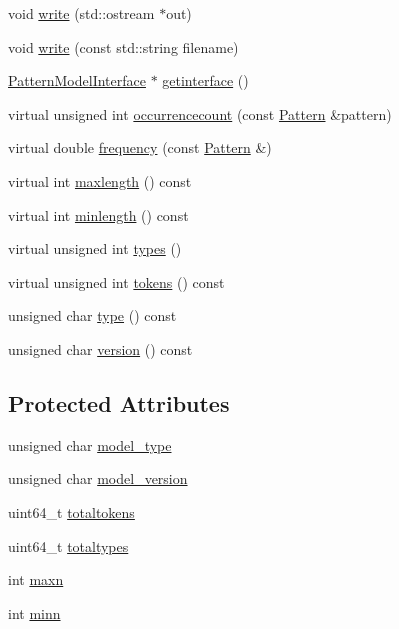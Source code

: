 \begin{DoxyCompactItemize}
void \hyperlink{classPatternSetModel_a8b5731f823fd868cfc6b219e01b13343}{write} (std\+::ostream $\ast$out)
\item 
void \hyperlink{classPatternSetModel_ac1fe33cf4ea003f37779fd39319d06fa}{write} (const std\+::string filename)
\item 
\hyperlink{classPatternModelInterface}{Pattern\+Model\+Interface} $\ast$ \hyperlink{classPatternSetModel_af2ead0d1766424cb00e95f76cab0c334}{getinterface} ()
\item 
virtual unsigned int \hyperlink{classPatternSetModel_ab1ca42eb82df349263b10c57f968678e}{occurrencecount} (const \hyperlink{classPattern}{Pattern} \&pattern)
\item 
virtual double \hyperlink{classPatternSetModel_af5bdb2a283c048233e62b2a0741b7cab}{frequency} (const \hyperlink{classPattern}{Pattern} \&)
\item 
virtual int \hyperlink{classPatternSetModel_abd386cc901e2328079a349eae42d9ee8}{maxlength} () const 
\item 
virtual int \hyperlink{classPatternSetModel_a3cc6ca22d4dd68270068d5a4e05f530a}{minlength} () const 
\item 
virtual unsigned int \hyperlink{classPatternSetModel_a178d3c988a43130b4ba3d4fa57001055}{types} ()
\item 
virtual unsigned int \hyperlink{classPatternSetModel_aa834dd6a5467ea8a68680512d6251e16}{tokens} () const 
\item 
unsigned char \hyperlink{classPatternSetModel_a5ca48d3e5c9d52b3eae858d033706bf6}{type} () const 
\item 
unsigned char \hyperlink{classPatternSetModel_a664147d04aad980c5cefbffca9bb4285}{version} () const 
\end{DoxyCompactItemize}
\subsection*{Protected Attributes}
\begin{DoxyCompactItemize}
\item 
unsigned char \hyperlink{classPatternSetModel_a932b792d6f1dc488c772efb6c8530b85}{model\+\_\+type}
\item 
unsigned char \hyperlink{classPatternSetModel_ad80b50a1066615f9b20e791dfee50296}{model\+\_\+version}
\item 
uint64\+\_\+t \hyperlink{classPatternSetModel_ae64f1edc5d72066d8cc6fbb80422518b}{totaltokens}
\item 
uint64\+\_\+t \hyperlink{classPatternSetModel_ac7aeed2a7d78ef5883ba38618a3e49a7}{totaltypes}
\item 
int \hyperlink{classPatternSetModel_aa1b03b92de5af1cf36545dfbff5b56f4}{maxn}
\item 
int \hyperlink{classPatternSetModel_a52940caa8c4bb3900f75ead2cb8a97c8}{minn}
\end{DoxyCompactItemize}


